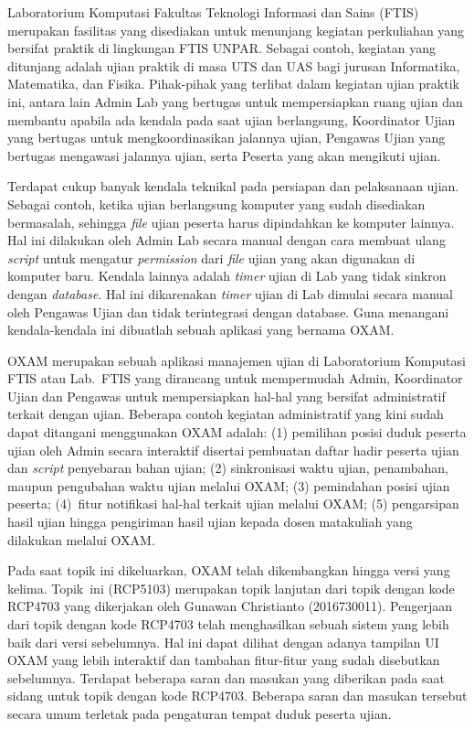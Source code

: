 \documentclass[a4paper,twoside]{article}
\begin{document}
Laboratorium Komputasi Fakultas Teknologi Informasi dan Sains (FTIS) merupakan fasilitas yang disediakan untuk menunjang kegiatan perkuliahan yang bersifat praktik di lingkungan FTIS UNPAR. Sebagai contoh, kegiatan yang ditunjang adalah ujian praktik di masa UTS dan UAS bagi jurusan Informatika, Matematika, dan Fisika. Pihak-pihak yang terlibat dalam kegiatan ujian praktik ini, antara lain Admin Lab yang bertugas untuk mempersiapkan ruang ujian dan membantu apabila ada kendala pada saat ujian berlangsung,  Koordinator Ujian yang bertugas untuk mengkoordinasikan jalannya ujian, Pengawas Ujian yang bertugas mengawasi jalannya ujian, serta Peserta yang akan mengikuti ujian.

\setlength\parindent{24pt}

Terdapat cukup banyak kendala teknikal pada persiapan dan pelaksanaan ujian. Sebagai contoh, ketika ujian berlangsung komputer yang sudah disediakan bermasalah, sehingga \textit{file} ujian peserta harus dipindahkan ke komputer lainnya. Hal ini dilakukan oleh Admin Lab secara manual dengan cara membuat ulang \textit{script} untuk mengatur \textit{permission} dari \textit{file} ujian yang akan digunakan di komputer baru. Kendala lainnya adalah \textit{timer} ujian di Lab yang tidak sinkron dengan \textit{database}. Hal ini dikarenakan \textit{timer} ujian di Lab dimulai secara manual oleh Pengawas Ujian dan tidak terintegrasi dengan database. Guna menangani kendala-kendala ini dibuatlah sebuah aplikasi yang bernama OXAM. 

OXAM merupakan sebuah aplikasi manajemen ujian di Laboratorium Komputasi FTIS atau Lab.~FTIS yang dirancang untuk mempermudah Admin, Koordinator Ujian dan Pengawas untuk mempersiapkan hal-hal yang bersifat administratif terkait dengan ujian. Beberapa contoh kegiatan administratif yang kini sudah dapat ditangani menggunakan OXAM adalah: (1) pemilihan posisi duduk peserta ujian oleh Admin secara interaktif disertai pembuatan daftar hadir peserta ujian dan \textit{script} penyebaran bahan ujian; (2) sinkronisasi waktu ujian, penambahan, maupun pengubahan waktu ujian melalui OXAM; (3) pemindahan posisi ujian peserta; (4)~fitur notifikasi hal-hal terkait ujian melalui OXAM; (5) pengarsipan hasil ujian  hingga pengiriman hasil ujian kepada dosen matakuliah yang dilakukan melalui OXAM.

Pada saat topik ini dikeluarkan, OXAM telah dikembangkan hingga versi yang kelima. Topik~ini (RCP5103) merupakan topik lanjutan dari topik dengan kode RCP4703 yang dikerjakan oleh Gunawan Christianto (2016730011). Pengerjaan dari topik dengan kode RCP4703 telah menghasilkan sebuah sistem yang lebih baik dari versi sebelumnya. Hal ini dapat dilihat dengan adanya tampilan UI OXAM yang lebih interaktif dan tambahan fitur-fitur yang sudah disebutkan sebelumnya. Terdapat beberapa saran dan masukan yang diberikan pada saat sidang untuk topik dengan kode RCP4703. Beberapa saran dan masukan tersebut secara umum terletak pada pengaturan tempat duduk peserta ujian.
\end{document}
